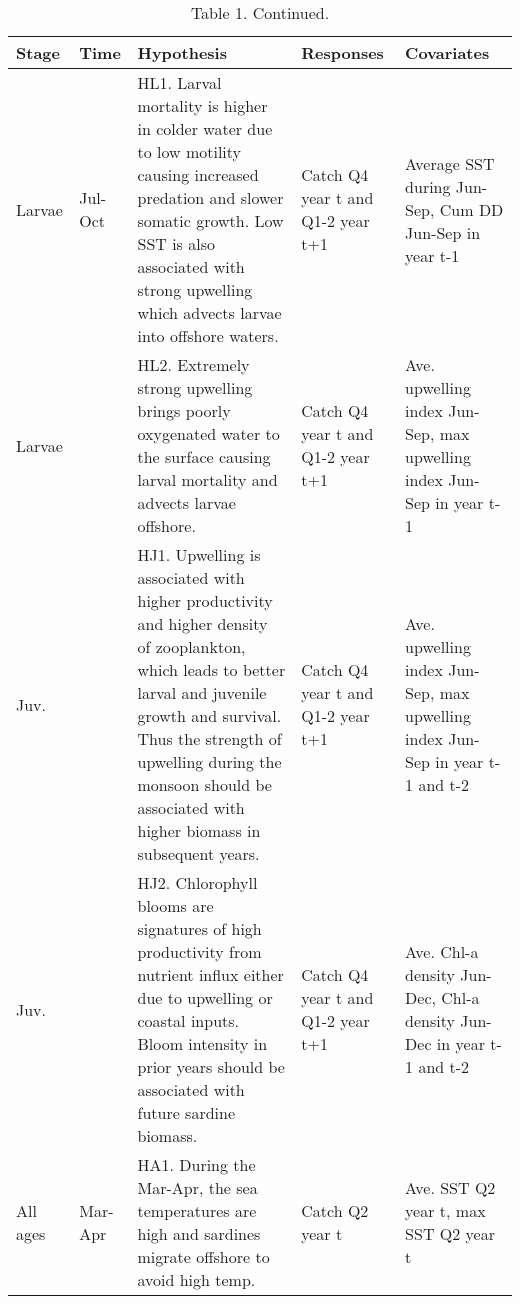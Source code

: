 \section{}\label{section}

\clearpage

\begin{table}[t]

\caption{\label{tab:unnamed-chunk-3}Table 1. Continued.}
\centering
\begin{tabular}{>{\raggedright\arraybackslash}p{1cm}|>{\raggedright\arraybackslash}p{.5cm}|>{\raggedright\arraybackslash}p{8.5cm}|>{\raggedright\arraybackslash}p{2cm}|>{\raggedright\arraybackslash}p{3cm}}
\hline
Stage & Time & Hypothesis & Responses & Covariates\\
\hline
Larvae & Jul-Oct & HL1.  Larval mortality is higher in colder water due to low motility causing increased predation and slower somatic growth. Low SST is also associated with strong upwelling which advects larvae into offshore waters. & Catch Q4 year t and Q1-2 year t+1 & Average SST during Jun-Sep, Cum DD Jun-Sep in year t-1\\
\hline
Larvae &  & HL2. Extremely strong upwelling brings poorly oxygenated water to the surface causing larval mortality and advects larvae offshore. & Catch Q4 year t and Q1-2 year t+1 & Ave. upwelling index Jun-Sep, max upwelling index Jun-Sep in year t-1\\
\hline
Juv. &  & HJ1. Upwelling is associated with higher productivity and higher density of zooplankton, which leads to better larval and juvenile growth and survival.  Thus the strength of upwelling during the monsoon should be associated with higher biomass in subsequent years. & Catch Q4 year t and Q1-2 year t+1 & Ave. upwelling index Jun-Sep, max upwelling index Jun-Sep in year t-1 and t-2\\
\hline
Juv. &  & HJ2. Chlorophyll blooms are signatures of high productivity from nutrient influx either due to upwelling or coastal inputs.  Bloom intensity in prior years should be associated with future sardine biomass. & Catch Q4 year t and Q1-2 year t+1 & Ave. Chl-a density Jun-Dec, Chl-a density Jun-Dec in year t-1 and t-2\\
\hline
All ages & Mar-Apr & HA1. During the Mar-Apr, the sea temperatures are high and sardines migrate offshore to avoid high temp. & Catch Q2 year t & Ave. SST Q2 year t, max SST Q2 year t\\
\hline
\end{tabular}
\end{table}


